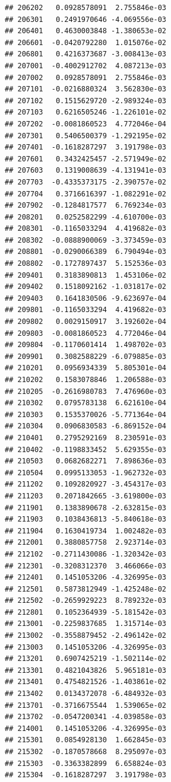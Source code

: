 \begin{frame}[fragile]
\begin{verbatim}
## 206202   0.0928578091  2.755846e-03
## 206301   0.2491970646 -4.069556e-03
## 206401   0.4630003848 -1.380653e-02
## 206601  -0.0420792280  1.015076e-02
## 206801   0.4216373687 -3.008413e-03
## 207001  -0.4002912702  4.087213e-03
## 207002   0.0928578091  2.755846e-03
## 207101  -0.0216880324  3.562830e-03
## 207102   0.1515629720 -2.989324e-03
## 207103   0.6216505246 -1.226101e-02
## 207202  -0.0081860523  4.772046e-04
## 207301   0.5406500379 -1.292195e-02
## 207401  -0.1618287297  3.191798e-03
## 207601   0.3432425457 -2.571949e-02
## 207603   0.1319008639 -4.131941e-03
## 207703  -0.4335373175 -2.390757e-02
## 207704   0.3716616397 -1.082291e-02
## 207902  -0.1284817577  6.769234e-03
## 208201   0.0252582299 -4.610700e-03
## 208301  -0.1165033294  4.419682e-03
## 208302  -0.0888900069 -3.373459e-03
## 208801  -0.0290066389  6.790494e-03
## 208802  -0.1727897437  5.152536e-03
## 209401   0.3183890813  1.453106e-02
## 209402   0.1518092162 -1.031817e-02
## 209403   0.1641830506 -9.623697e-04
## 209801  -0.1165033294  4.419682e-03
## 209802   0.0029150917  3.192602e-04
## 209803  -0.0081860523  4.772046e-04
## 209804  -0.1170601414  1.498702e-03
## 209901   0.3082588229 -6.079885e-03
## 210201   0.0956934339  5.805301e-04
## 210202   0.1583078846  1.206588e-03
## 210205  -0.2616980783  7.476960e-03
## 210302   0.0795783138  6.621610e-04
## 210303   0.1535370026 -5.771364e-04
## 210304   0.0906830583 -6.869152e-04
## 210401   0.2795292169  8.230591e-03
## 210402  -0.1198833452  5.629355e-03
## 210503   0.0682682271  7.898636e-03
## 210504   0.0995133053 -1.962732e-03
## 211202   0.1092820927 -3.454317e-03
## 211203   0.2071842665 -3.619800e-03
## 211901   0.1383890678 -2.632815e-03
## 211903   0.1038436813 -5.840618e-03
## 211904   0.1630419734  1.002482e-03
## 212001   0.3880857758  2.923714e-03
## 212102  -0.2711430086 -1.320342e-03
## 212301  -0.3208312370  3.466066e-03
## 212401   0.1451053206 -4.326995e-03
## 212501   0.5873812949 -1.425248e-02
## 212502  -0.2659929223  8.789232e-03
## 212801   0.1052364939 -5.181542e-03
## 213001  -0.2259837685  1.315714e-03
## 213002  -0.3558879452 -2.496142e-02
## 213003   0.1451053206 -4.326995e-03
## 213201   0.6907425219 -1.502114e-02
## 213301   0.4821043826  5.965181e-03
## 213401   0.4754821526 -1.403861e-02
## 213402   0.0134372078 -6.484932e-03
## 213701  -0.3716675544  1.539065e-02
## 213702  -0.0547200341 -4.039858e-03
## 214001   0.1451053206 -4.326995e-03
## 215301   0.0854928130  1.662845e-03
## 215302  -0.1870578668  8.295097e-03
## 215303  -0.3363382899  6.658824e-03
## 215304  -0.1618287297  3.191798e-03

\end{verbatim}
\end{frame}
